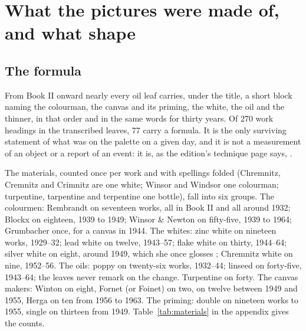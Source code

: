\chapter{What the pictures were made of, and what shape}

\section{The formula}

From Book II onward nearly every oil leaf carries, under the title, a short block naming the colourman, the canvas and its priming, the white, the oil and the thinner, in that order and in the same words for thirty years. Of 270 work headings in the transcribed leaves, 77 carry a formula. It is the only surviving statement of what was on the palette on a given day, and it is not a measurement of an object or a report of an event: it is, as the edition's technique page says, .

The materials, counted once per work and with spellings folded (Chremnitz, Cremnitz and Crimnitz are one white; Winsor and Windsor one colourman; turpentine, tarpentine and terpentine one bottle), fall into six groups. The colourmen: Rembrandt on seventeen works, all in Book II and all around 1932; Blockx on eighteen, 1939 to 1949; Winsor \& Newton on fifty-five, 1939 to 1964; Grumbacher once, for a canvas in 1944. The whites: zinc white on nineteen works, 1929--32; lead white on twelve, 1943--57; flake white on thirty, 1944--64; silver white on eight, around 1949, which she once glosses ; Chremnitz white on nine, 1952--56. The oils: poppy on twenty-six works, 1932--44; linseed on forty-five, 1943--64; the leaves never remark on the change. Turpentine on forty. The canvas makers: Winton on eight, Fornet (or Foinet) on two,  on twelve between 1949 and 1955, Herga on ten from 1956 to 1963. The priming: double on nineteen works to 1955, single on thirteen from 1949. Table~\ref{tab:materials} in the appendix gives the counts.

